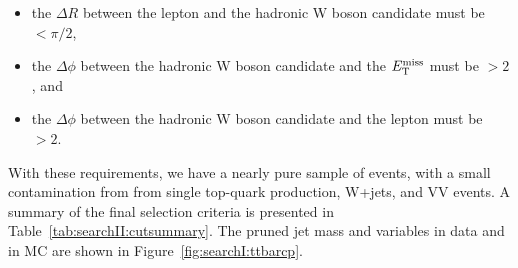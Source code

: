 \begin{itemize}
\itemsep0em 
  \item the $\Delta R$ between the lepton and the hadronic W boson candidate must be $< \pi/2$, %
  \item the $\Delta \phi$ between the hadronic W boson candidate and the $E_{\mathrm{T}}^{\text{miss}}$ must be $>2$, and %
  \item the $\Delta \phi$ between the hadronic W boson candidate and the lepton must be $>2$.%
\end{itemize}
With these requirements, we have a nearly pure sample of \ttbar events, with a small contamination from
from single top-quark production, W+jets, and VV events. A summary of the final selection criteria is presented in Table~\ref{tab:searchII:cutsummary}. The pruned jet mass and \nsubj variables in data and in MC are shown in Figure~\ref{fig:searchI:ttbarcp}.
